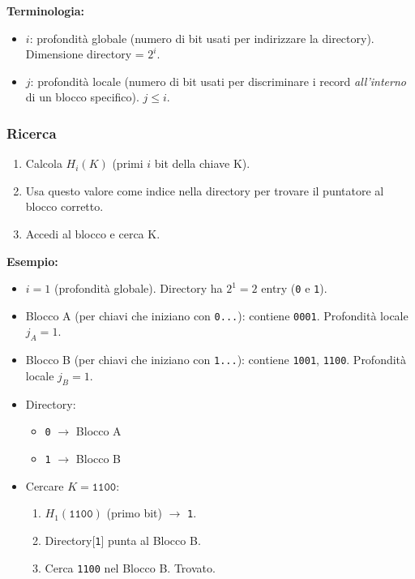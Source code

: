 \textbf{Terminologia:}
\begin{itemize}
    \item $i$: profondità globale (numero di bit usati per indirizzare la directory). Dimensione directory = $2^i$.
    \item $j$: profondità locale (numero di bit usati per discriminare i record \textit{all'interno} di un blocco specifico). $j \le i$.
\end{itemize}

\subsubsection{Ricerca}
\begin{enumerate}
    \item Calcola $H_i(K)$ (primi $i$ bit della chiave K).
    \item Usa questo valore come indice nella directory per trovare il puntatore al blocco corretto.
    \item Accedi al blocco e cerca K.
\end{enumerate}

\textbf{Esempio:}
\begin{itemize}
    \item $i = 1$ (profondità globale). Directory ha $2^1 = 2$ entry (\texttt{0} e \texttt{1}).
    \item Blocco A (per chiavi che iniziano con \texttt{0...}): contiene \texttt{0001}. Profondità locale $j_A = 1$.
    \item Blocco B (per chiavi che iniziano con \texttt{1...}): contiene \texttt{1001}, \texttt{1100}. Profondità locale $j_B = 1$.
    \item Directory:
    \begin{itemize}
        \item \texttt{0} $\rightarrow$ Blocco A
        \item \texttt{1} $\rightarrow$ Blocco B
    \end{itemize}
    \item Cercare $K = \texttt{1100}$:
    \begin{enumerate}
        \item $H_1(\texttt{1100})$ (primo bit) $\rightarrow$ \texttt{1}.
        \item Directory[\texttt{1}] punta al Blocco B.
        \item Cerca \texttt{1100} nel Blocco B. Trovato.
    \end{enumerate}
\end{itemize}

